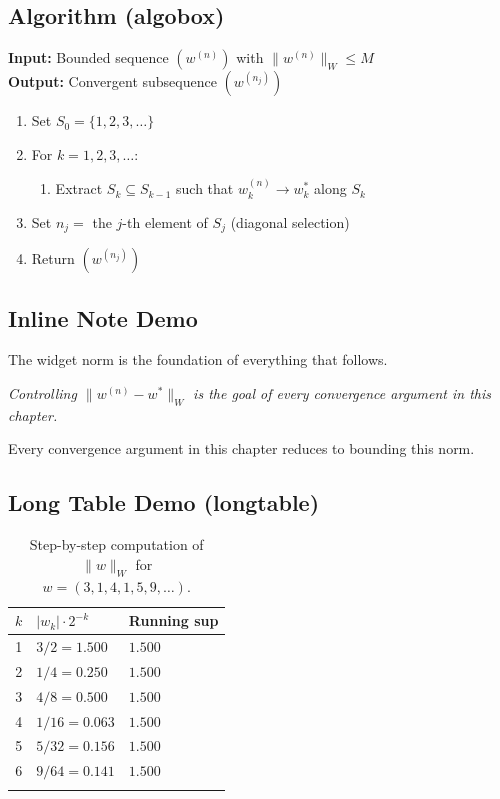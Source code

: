 \documentclass[10pt, a4paper]{article}
\newcommand{\note}[1]{\par{\small\textit{#1}}\par}
\theoremstyle{definition}
\theoremstyle{remark}
\begin{document}
\subsection{Algorithm (algobox)}

\begin{algobox}
\textbf{Input:} Bounded sequence $(w^{(n)})$ with $\|w^{(n)}\|_W \le M$\\
\textbf{Output:} Convergent subsequence $(w^{(n_j)})$

\begin{enumerate}[nosep]
  \item Set $S_0 = \{1, 2, 3, \ldots\}$
  \item For $k = 1, 2, 3, \ldots$:
    \begin{enumerate}[nosep, label=(\alph*)]
      \item Extract $S_k \subseteq S_{k-1}$ such that $w^{(n)}_k \to w^*_k$ along $S_k$
    \end{enumerate}
  \item Set $n_j =$ the $j$-th element of $S_j$ \quad (diagonal selection)
  \item Return $(w^{(n_j)})$
\end{enumerate}
\end{algobox}

\subsection{Inline Note Demo}

The widget norm is the foundation of everything that follows.

\note{Controlling $\|w^{(n)} - w^*\|_W$ is the goal of every convergence argument in this chapter.}

Every convergence argument in this chapter reduces to bounding this norm.

\subsection{Long Table Demo (longtable)}

\begin{longtable}{c l l}
\toprule
$k$ & $|w_k| \cdot 2^{-k}$ & Running sup \\
\midrule
\endhead
1 & $3/2 = 1.500$ & $1.500$ \\
2 & $1/4 = 0.250$ & $1.500$ \\
3 & $4/8 = 0.500$ & $1.500$ \\
4 & $1/16 = 0.063$ & $1.500$ \\
5 & $5/32 = 0.156$ & $1.500$ \\
6 & $9/64 = 0.141$ & $1.500$ \\
\bottomrule
\caption{Step-by-step computation of $\|w\|_W$ for $w = (3,1,4,1,5,9,\ldots)$.}
\end{longtable}
\end{document}
